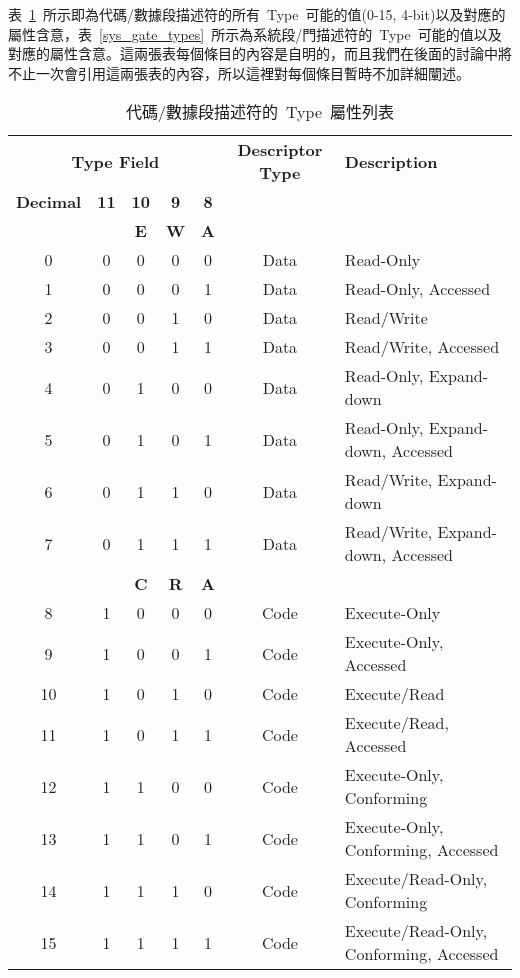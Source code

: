 \begin{itemize}
表~\ref{code_data_types}~所示即為代碼/數據段描述符的所有~Type~可能的值(0-15, 4-bit)以及對應的屬性含意，表~\ref{sys_gate_types}~所示為系統段/門描述符的~Type~可能的值以及對應的屬性含意。這兩張表每個條目的內容是自明的，而且我們在後面的討論中將不止一次會引用這兩張表的內容，所以這裡對每個條目暫時不加詳細闡述。

\begin{center}\begin{longtable}{c|c|c|c|c|c|l}
\caption[]{代碼/數據段描述符的~Type~屬性列表}\label{code_data_types}\\
\hline
\multicolumn{5}{c|}{\textbf{Type Field}} & \textbf{Descriptor Type} & \textbf{Description}\bigstrut\\
\cline{1-5}
\textbf{Decimal} & \textbf{11} & \textbf{10} & \textbf{9} & \textbf{8} & & \\
        &    &  \textbf{E} & \textbf{W} & \textbf{A} & & \\
\hline
0 & 0 & 0 & 0 & 0 & Data & Read-Only\\
1 & 0 & 0 & 0 & 1 & Data & Read-Only, Accessed\\
2 & 0 & 0 & 1 & 0 & Data & Read/Write\\
3 & 0 & 0 & 1 & 1 & Data & Read/Write, Accessed\\
4 & 0 & 1 & 0 & 0 & Data & Read-Only, Expand-down\\
5 & 0 & 1 & 0 & 1 & Data & Read-Only, Expand-down, Accessed\\
6 & 0 & 1 & 1 & 0 & Data & Read/Write, Expand-down\\
7 & 0 & 1 & 1 & 1 & Data & Read/Write, Expand-down, Accessed\\
\hline
        &    &  \textbf{C} & \textbf{R} & \textbf{A} & & \\
\hline
8 & 1 & 0 & 0 & 0 & Code & Execute-Only\\
9 & 1 & 0 & 0 & 1 & Code & Execute-Only, Accessed\\
10 & 1 & 0 & 1 & 0 & Code & Execute/Read\\
11 & 1 & 0 & 1 & 1 & Code & Execute/Read, Accessed\\
12 & 1 & 1 & 0 & 0 & Code & Execute-Only, Conforming\\
13 & 1 & 1 & 0 & 1 & Code & Execute-Only, Conforming, Accessed\\
14 & 1 & 1 & 1 & 0 & Code & Execute/Read-Only, Conforming\\
15 & 1 & 1 & 1 & 1 & Code & Execute/Read-Only, Conforming, Accessed\\
\hline
\end{longtable}\end{center}


\end{itemize}
